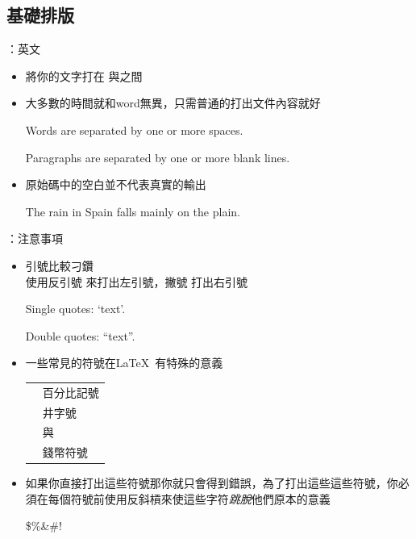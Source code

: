 \documentclass{beamer}
\begin{document}
\subsection{基礎排版}
\begin{frame}[fragile]{\insertsubsection{}：英文}
\small
\begin{itemize}
\item 將你的文字打在 與之間
\item 大多數的時間就和word無異，只需普通的打出文件內容就好%
\begin{exampletwouptiny}
Words are separated by one or more
spaces.

Paragraphs are separated by one
or more blank lines.
\end{exampletwouptiny}
\item 原始碼中的空白並不代表真實的輸出
\begin{exampletwouptiny}
The   rain       in Spain
falls mainly on the plain.
\end{exampletwouptiny}
\end{itemize}
\end{frame}

\begin{frame}[fragile]{\insertsubsection{}：注意事項}
\small
\begin{itemize}
\item 引號比較刁鑽\\
使用反引號 \keystroke{\`{}}來打出左引號，撇號 \keystroke{\'{}}打出右引號
\begin{exampletwouptiny}
Single quotes: `text'.

Double quotes: ``text''.
\end{exampletwouptiny}

\item 一些常見的符號在\LaTeX\ 有特殊的意義\\[1ex]
\begin{tabular}{cl}
\keystrokebftt{\%} & 百分比記號              \\
\keystrokebftt{\#} & 井字號 \\
\keystrokebftt{\&} & 與                 \\
\keystrokebftt{\$} & 錢幣符號               \\
\end{tabular}
\item 如果你直接打出這些符號那你就只會得到錯誤，為了打出這些這些符號，你必須在每個符號前使用反斜槓來使這些字符\emph{跳脫}他們原本的意義 
\begin{exampletwoup}
\$\%\&\#!
\end{exampletwoup}
\end{itemize}
\end{frame}
\end{document}
